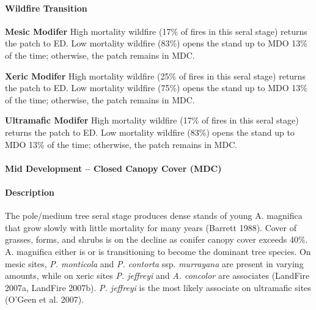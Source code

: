 \paragraph{Wildfire Transition}
\begin{adjustwidth}{2cm}{}
\textbf{Mesic Modifer } High mortality wildfire (17\% of fires in this seral stage) returns the patch to ED. Low mortality wildfire (83\%) opens the stand up to MDO 13\% of the time; otherwise, the patch remains in MDC. 

\textbf{Xeric Modifer}  High mortality wildfire (25\% of fires in this seral stage) returns the patch to ED. Low mortality wildfire (75\%) opens the stand up to MDO 13\% of the time; otherwise, the patch remains in MDC.

\textbf{Ultramafic Modifer} High mortality wildfire (17\% of fires in this seral stage) returns the patch to ED. Low mortality wildfire (83\%) opens the stand up to MDO 13\% of the time; otherwise, the patch remains in MDC.

\end{adjustwidth}

\noindent\hrulefill

\paragraph{Mid Development – Closed Canopy Cover (MDC)}

\paragraph{Description} The pole/medium tree seral stage produces dense stands of young A. magnifica that grow slowly with little mortality for many years (Barrett 1988). Cover of grasses, forms, and shrubs is on the decline as conifer canopy cover exceeds 40\%. A. magnifica either is or is transitioning to become the dominant tree species. On mesic sites, \emph{P. monticola} and \emph{P. contorta} ssp. \emph{murrayana} are present in varying amounts, while on xeric sites \emph{P. jeffreyi} and \emph{A. concolor} are associates (LandFire 2007a, LandFire 2007b). \emph{P. jeffreyi} is the most likely associate on ultramafic sites (O’Geen et al. 2007).


